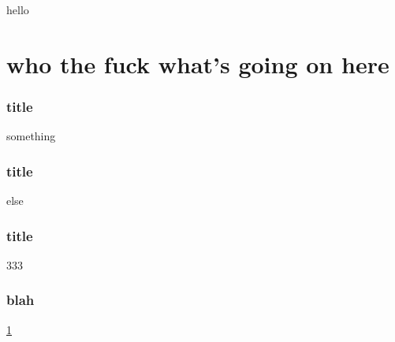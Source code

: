 \documentclass{beamer}
\begin{document}
\begin{frame}
  hello
\end{frame}
\section{who the fuck what's going on here}\label{sec:test2333}
\begin{frame}[t]\frametitle{title}
    something
\end{frame}


\begin{frame}[t]\frametitle{title}
    else
\end{frame}


\begin{frame}[t]\frametitle{title}
    333
\end{frame}

\begin{frame}[t]\frametitle{blah}
    \ref{sec:test2333}~\cite{dynamo}

\end{frame}
\end{document}

